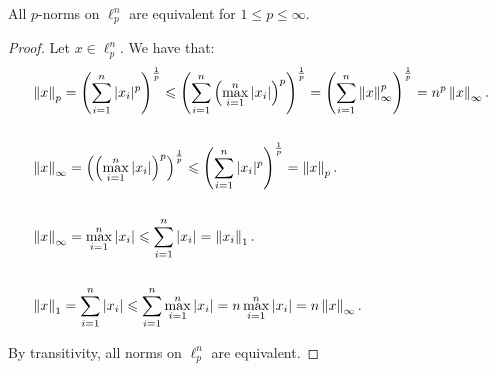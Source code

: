     \begin{theorem}\label{thm:norms-equivalent}
        All $p$-norms on $\ell_p^n$ are equivalent for $1 \leq p \leq \infty$.
    \end{theorem}
        \begin{proof}
            Let $x \in \ell_p^n$. We have that:
                \begin{equation*}
                \begin{split}
                    &\left\lVert x \right\rVert_p = \left( \sum_{i = 1}^n |x_i|^p \right)^\frac{1}{p} 
                        \leqslant \left( \sum_{i = 1}^n \left( \max_{i = 1}^n |x_i| \right)^p \right)^\frac{1}{p} 
                        = \left( \sum_{i = 1}^n \left\lVert x \right\rVert_\infty ^p \right)^\frac{1}{p} 
                        = n^p \left\lVert x \right\rVert_\infty. \\
                    &\phantom{a} \\
                    &\left\lVert x \right\rVert_\infty = \left( \left( \max_{i = 1}^n |x_i| \right)^p \right)^\frac{1}{p} \leqslant \left( \sum_{i = 1}^n |x_i|^p \right)^\frac{1}{p} = \left\lVert x \right\rVert_p. \\
                    &\phantom{a} \\
                    &\left\lVert x \right\rVert_\infty = \max_{i = 1}^n |x_i| \leqslant \sum_{i = 1}^n |x_i| = \left\lVert x_i \right\rVert_1. \\
                    &\phantom{a} \\
                    &\left\lVert x \right\rVert_1 = \sum_{i = 1}^n |x_i| \leqslant \sum_{i = 1}^n \max_{i =1}^n |x_i| = n \max_{i = 1}^n |x_i| = n \left\lVert x \right\rVert_\infty.
                \end{split}
                \end{equation*}

                
            By transitivity, all norms on $\ell_p^n$ are equivalent.
        \end{proof}

    \begin{center}
    \end{center}


